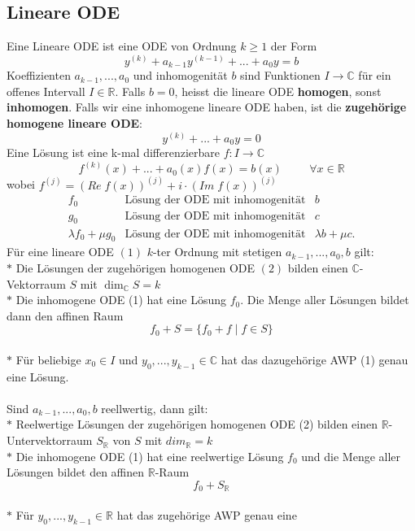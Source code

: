 \subsection{Lineare ODE}
  Eine Lineare ODE ist eine ODE von Ordnung $k\geq1$ der Form
  $$y^{(k)}+a_{k-1}y^{(k-1)}+...+a_0y=b$$ Koeffizienten $a_{k-1},...,a_0$ und
  inhomogenität $b$ sind Funktionen $I\rightarrow\mathbb C$ für ein offenes
  Intervall $I\in\mathbb R$.
  Falls $b=0$, heisst die lineare ODE \textbf{homogen}, sonst
  \textbf{inhomogen}. Falls wir eine inhomogene lineare ODE haben, ist die
  \textbf{zugehörige homogene lineare ODE}: $$y^{(k)}+...+a_0y=0$$
  Eine Lösung ist eine k-mal differenzierbare $f:I\rightarrow \mathbb C$
  $$f^{(k)}(x)+...+a_0(x)f(x)=b(x)\hspace{1cm}\forall x\in\mathbb R$$ wobei
  $f^{(j)}=(Re\; f(x))^{(j)} + i \cdot(Im\; f(x))^{(j)}$\\
  $$\begin{array}{rll}
    f_0&\text{Lösung der ODE mit inhomogenität}&b\\
    g_0&\text{Lösung der ODE mit inhomogenität}&c\\
    \lambda f_0+\mu g_0&\text{Lösung der ODE mit inhomogenität}&\lambda b +\mu
    c.
  \end{array}$$
  Für eine lineare ODE $(1)$ $k$-ter Ordnung mit stetigen $a_{k-1},...,a_0,b$ gilt:\\
  $*$ Die Lösungen der zugehörigen homogenen ODE $(2)$ bilden einen $\mathbb 
  C$-Vektorraum $S$ mit $\dim_{\mathbb C}S=k$\\
  $*$ Die inhomogene ODE (1) hat eine Lösung $f_0$. Die Menge aller Lösungen
  bildet dann den affinen Raum $$f_0+S=\{f_0+f\mid f\in S\}$$\\
  $*$ Für beliebige $x_0\in I$ und $y_0,...,y_{k-1}\in\mathbb C$ hat das
  dazugehörige AWP (1) genau eine Lösung.\\\\
  Sind $a_{k-1},...,a_0,b$ reellwertig, dann gilt:\\
  $*$ Reelwertige Lösungen der zugehörigen homogenen ODE (2) bilden einen
  $\mathbb R$-Untervektorraum $S_{\mathbb R}$ von $S$ mit $dim_{\mathbb R}=k$\\
  $*$ Die inhomogene ODE (1) hat eine reelwertige Lösung $f_0$ und die Menge
  aller Lösungen bildet den affinen $\mathbb R$-Raum $$f_0+S_{\mathbb R}$$\\
  $*$ Für $y_0,...,y_{k-1}\in\mathbb R$ hat das zugehörige AWP genau eine
